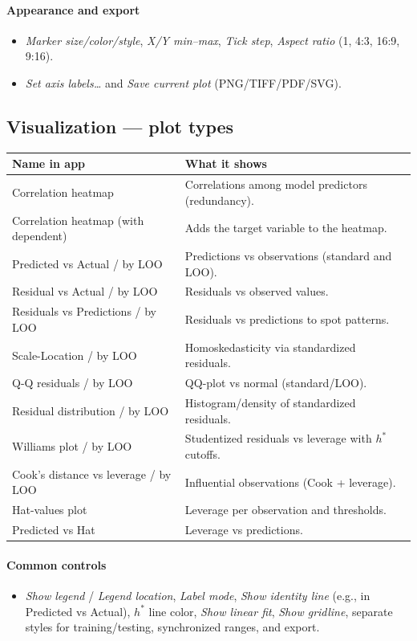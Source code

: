 \documentclass[12pt,a4paper]{article}
\begin{document}
\paragraph{Appearance and export}
\begin{itemize}
  \item \emph{Marker size/color/style}, \emph{X/Y min–max}, \emph{Tick step}, \emph{Aspect ratio} (1, 4:3, 16:9, 9:16).
  \item \emph{Set axis labels…} and \emph{Save current plot} (PNG/TIFF/PDF/SVG).
\end{itemize}

\subsection{Visualization — plot types}
\begin{longtable}{@{}p{6.2cm}p{8.2cm}@{}}
\toprule
\textbf{Name in app} & \textbf{What it shows} \\
\midrule
Correlation heatmap & Correlations among model predictors (redundancy). \\
Correlation heatmap (with dependent) & Adds the target variable to the heatmap. \\
Predicted vs Actual / by LOO & Predictions vs observations (standard and LOO). \\
Residual vs Actual / by LOO & Residuals vs observed values. \\
Residuals vs Predictions / by LOO & Residuals vs predictions to spot patterns. \\
Scale-Location / by LOO & Homoskedasticity via standardized residuals. \\
Q-Q residuals / by LOO & QQ-plot vs normal (standard/LOO). \\
Residual distribution / by LOO & Histogram/density of standardized residuals. \\
Williams plot / by LOO & Studentized residuals vs leverage with $h^*$ cutoffs. \\
Cook's distance vs leverage / by LOO & Influential observations (Cook + leverage). \\
Hat-values plot & Leverage per observation and thresholds. \\
Predicted vs Hat & Leverage vs predictions. \\
\bottomrule
\end{longtable}

\paragraph{Common controls}
\begin{itemize}
  \item \emph{Show legend} / \emph{Legend location}, \emph{Label mode}, \emph{Show identity line} (e.g., in Predicted vs Actual), $h^*$ line color, \emph{Show linear fit}, \emph{Show gridline}, separate styles for training/testing, synchronized ranges, and export.
\end{itemize}
\end{document}
